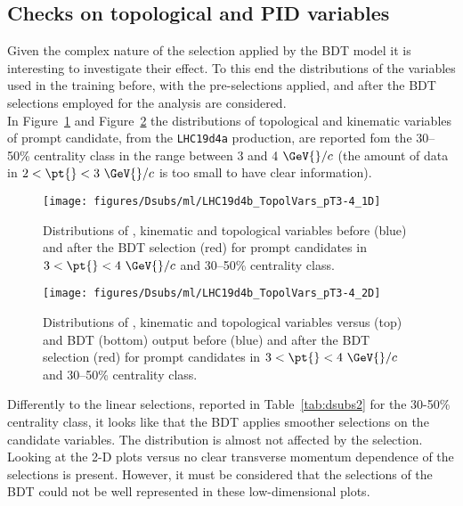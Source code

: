 \subsection{Checks on topological and PID variables}
Given the complex nature of the selection applied by the BDT model it is interesting to investigate their effect. To this end the distributions 
of the variables used in the training before, with the pre-selections applied, and after the BDT selections employed for the analysis are considered. \\
In Figure~\ref{fig:topo_1D_3050_pt3_4} and Figure~\ref{fig:topo_2D_3050_pt3_4} the distributions of topological and kinematic variables of prompt \Dsubs{} candidate, from the \texttt{LHC19d4a} production, are reported fom the 30--50\% centrality class 
in the \pt{} range between 3 and 4 \(\GeV{}/c\) (the amount of data in \(2 < \pt{} < 3~\GeV{}/c\) is too small to have clear information). \\
\begin{figure}[htbp]
  \begin{center}
   \texttt{[image: figures/Dsubs/ml/LHC19d4b\_TopolVars\_pT3-4\_1D]}
  \caption{Distributions of \pt{}, kinematic and topological variables before (blue) and after the BDT selection (red) for prompt \Dsubs{} candidates in \(3 < \pt{} < 4~\GeV{}/c\) and 30--50\% centrality class.}
  \label{fig:topo_1D_3050_pt3_4}
  \end{center}
\end{figure}
\begin{figure}[htbp]
  \begin{center}
   \texttt{[image: figures/Dsubs/ml/LHC19d4b\_TopolVars\_pT3-4\_2D]}
  \caption{Distributions of \pt{}, kinematic and topological variables versus \pt{} (top) and BDT (bottom) output before (blue) and after the BDT selection (red) for prompt \Dsubs{} candidates in \(3 < \pt{} < 4~\GeV{}/c\) and 30--50\% centrality class.}
  \label{fig:topo_2D_3050_pt3_4}
  \end{center}
\end{figure}
Differently to the linear selections, reported in Table~\ref{tab:dsubs2} for the 30-50\% centrality class, it looks like that the BDT applies smoother selections on the candidate variables. The \pt{} distribution is almost not affected by the selection. 
Looking at the 2-D plots versus \pt{} no clear transverse momentum dependence of the selections is present. However, it must be considered that the selections of the BDT could not be well 
represented in these low-dimensional plots. \\
